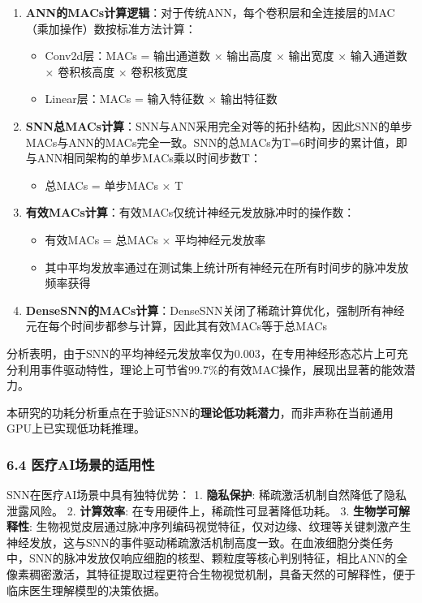 \documentclass[
]{article}
\providecommand{\tightlist}{%
  \setlength{\itemsep}{0pt}\setlength{\parskip}{0pt}}
\begin{document}
\begin{enumerate}
\def\labelenumi{\arabic{enumi}.}
\tightlist
\item
  \textbf{ANN的MACs计算逻辑}：对于传统ANN，每个卷积层和全连接层的MAC（乘加操作）数按标准方法计算：

  \begin{itemize}
  \tightlist
  \item
    Conv2d层：MACs = 输出通道数 × 输出高度 × 输出宽度 × 输入通道数 ×
    卷积核高度 × 卷积核宽度
  \item
    Linear层：MACs = 输入特征数 × 输出特征数
  \end{itemize}
\item
  \textbf{SNN总MACs计算}：SNN与ANN采用完全对等的拓扑结构，因此SNN的单步MACs与ANN的MACs完全一致。SNN的总MACs为T=6时间步的累计值，即与ANN相同架构的单步MACs乘以时间步数T：

  \begin{itemize}
  \tightlist
  \item
    总MACs = 单步MACs × T
  \end{itemize}
\item
  \textbf{有效MACs计算}：有效MACs仅统计神经元发放脉冲时的操作数：

  \begin{itemize}
  \tightlist
  \item
    有效MACs = 总MACs × 平均神经元发放率
  \item
    其中平均发放率通过在测试集上统计所有神经元在所有时间步的脉冲发放频率获得
  \end{itemize}
\item
  \textbf{DenseSNN的MACs计算}：DenseSNN关闭了稀疏计算优化，强制所有神经元在每个时间步都参与计算，因此其有效MACs等于总MACs
\end{enumerate}

分析表明，由于SNN的平均神经元发放率仅为0.003，在专用神经形态芯片上可充分利用事件驱动特性，理论上可节省99.7\%的有效MAC操作，展现出显著的能效潜力。

本研究的功耗分析重点在于验证SNN的\textbf{理论低功耗潜力}，而非声称在当前通用GPU上已实现低功耗推理。

\subsubsection{6.4
医疗AI场景的适用性}\label{ux533bux7597aiux573aux666fux7684ux9002ux7528ux6027}

SNN在医疗AI场景中具有独特优势： 1. \textbf{隐私保护}:
稀疏激活机制自然降低了隐私泄露风险。 2. \textbf{计算效率}:
在专用硬件上，稀疏性可显著降低功耗。 3. \textbf{生物学可解释性}:
生物视觉皮层通过脉冲序列编码视觉特征，仅对边缘、纹理等关键刺激产生神经发放，这与SNN的事件驱动稀疏激活机制高度一致。在血液细胞分类任务中，SNN的脉冲发放仅响应细胞的核型、颗粒度等核心判别特征，相比ANN的全像素稠密激活，其特征提取过程更符合生物视觉机制，具备天然的可解释性，便于临床医生理解模型的决策依据。
\end{document}

